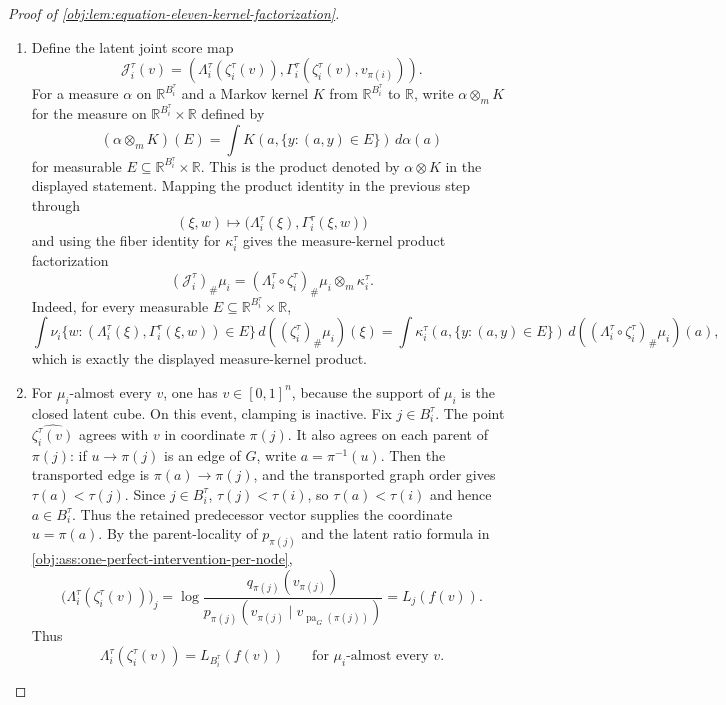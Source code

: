 \documentclass[11pt]{article}
\begin{document}
\begin{proof}[Proof of \cref{obj:lem:equation-eleven-kernel-factorization}]
\begin{enumerate}
\item Define the latent joint score map
\[
\mathcal J_i^\tau(v)
=
\left(
\Lambda_i^\tau(\zeta_i^\tau(v)),
\Gamma_i^\tau(\zeta_i^\tau(v),v_{\pi(i)})
\right).
\]
For a measure \(\alpha\) on \(\mathbb R^{B_i^\tau}\) and a Markov kernel \(K\) from \(\mathbb R^{B_i^\tau}\) to \(\mathbb R\), write \(\alpha\otimes_{\!m}K\) for the measure on \(\mathbb R^{B_i^\tau}\times\mathbb R\) defined by
\[
(\alpha\otimes_{\!m}K)(E)
=
\int K(a,\{y:(a,y)\in E\})\,d\alpha(a)
\]
for measurable \(E\subseteq\mathbb R^{B_i^\tau}\times\mathbb R\). This is the product denoted by \(\alpha\otimes K\) in the displayed statement. Mapping the product identity in the previous step through
\[
(\xi,w)\longmapsto
\bigl(\Lambda_i^\tau(\xi),\Gamma_i^\tau(\xi,w)\bigr)
\]
and using the fiber identity for \(\kappa_i^\tau\) gives the measure-kernel product factorization
\[
(\mathcal J_i^\tau)_{\#}\mu_i
=
(\Lambda_i^\tau\circ \zeta_i^\tau)_{\#}\mu_i
\otimes_{\!m} \kappa_i^\tau .
\]
Indeed, for every measurable \(E\subseteq \mathbb R^{B_i^\tau}\times\mathbb R\),
\[
\int
\nu_i\{w:(\Lambda_i^\tau(\xi),\Gamma_i^\tau(\xi,w))\in E\}\,
d((\zeta_i^\tau)_{\#}\mu_i)(\xi)
=
\int
\kappa_i^\tau(a,\{y:(a,y)\in E\})\,
d((\Lambda_i^\tau\circ\zeta_i^\tau)_{\#}\mu_i)(a),
\]
which is exactly the displayed measure-kernel product. %

\item For \(\mu_i\)-almost every \(v\), one has \(v\in[0,1]^n\), because the support of \(\mu_i\) is the closed latent cube. On this event, clamping is inactive. Fix \(j\in B_i^\tau\). The point \(\widehat{\zeta_i^\tau(v)}\) agrees with \(v\) in coordinate \(\pi(j)\). It also agrees on each parent of \(\pi(j)\): if \(u\to\pi(j)\) is an edge of \(G\), write \(a=\pi^{-1}(u)\). Then the transported edge is \(\pi(a)\to\pi(j)\), and the transported graph order gives \(\tau(a)<\tau(j)\). Since \(j\in B_i^\tau\), \(\tau(j)<\tau(i)\), so \(\tau(a)<\tau(i)\) and hence \(a\in B_i^\tau\). Thus the retained predecessor vector supplies the coordinate \(u=\pi(a)\). By the parent-locality of \(p_{\pi(j)}\) and the latent ratio formula in \cref{obj:ass:one-perfect-intervention-per-node},
\[
\bigl(\Lambda_i^\tau(\zeta_i^\tau(v))\bigr)_j
=
\log
\frac{q_{\pi(j)}(v_{\pi(j)})}
{p_{\pi(j)}(v_{\pi(j)}\mid v_{\operatorname{pa}_G(\pi(j))})}
=
L_j(f(v)).
\]
Thus
\[
\Lambda_i^\tau(\zeta_i^\tau(v))
=
L_{B_i^\tau}(f(v))
\qquad
\text{for \(\mu_i\)-almost every }v .
\] %


\end{enumerate}
\end{proof}
\end{document}
